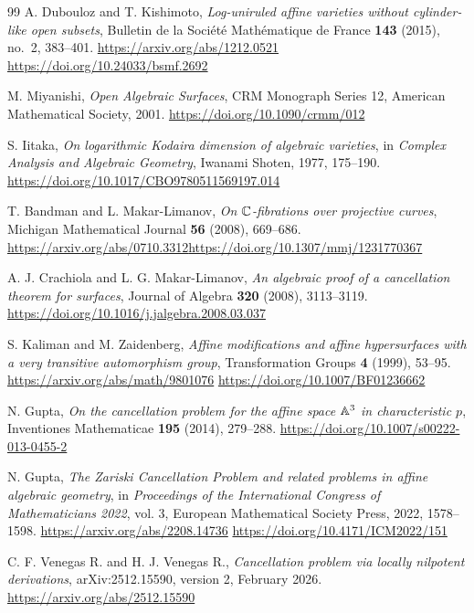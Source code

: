 \begin{thebibliography}{99}
A. Dubouloz and T. Kishimoto,
\emph{Log-uniruled affine varieties without cylinder-like open subsets},
Bulletin de la Soci\'et\'e Math\'ematique de France \textbf{143} (2015), no.~2, 383--401.
\url{https://arxiv.org/abs/1212.0521}\quad
\url{https://doi.org/10.24033/bsmf.2692}

M. Miyanishi,
\emph{Open Algebraic Surfaces},
CRM Monograph Series 12, American Mathematical Society, 2001.
\url{https://doi.org/10.1090/crmm/012}

S. Iitaka,
\emph{On logarithmic Kodaira dimension of algebraic varieties},
in \emph{Complex Analysis and Algebraic Geometry}, Iwanami Shoten, 1977, 175--190.
\url{https://doi.org/10.1017/CBO9780511569197.014}

T. Bandman and L. Makar-Limanov,
\emph{On $\mathbb C$-fibrations over projective curves},
Michigan Mathematical Journal \textbf{56} (2008), 669--686.
\url{https://arxiv.org/abs/0710.3312}\quad\url{https://doi.org/10.1307/mmj/1231770367}

A. J. Crachiola and L. G. Makar-Limanov,
\emph{An algebraic proof of a cancellation theorem for surfaces},
Journal of Algebra \textbf{320} (2008), 3113--3119.
\url{https://doi.org/10.1016/j.jalgebra.2008.03.037}

S. Kaliman and M. Zaidenberg,
\emph{Affine modifications and affine hypersurfaces with a very transitive automorphism group},
Transformation Groups \textbf{4} (1999), 53--95.
\url{https://arxiv.org/abs/math/9801076}\quad
\url{https://doi.org/10.1007/BF01236662}

N. Gupta,
\emph{On the cancellation problem for the affine space $\mathbb A^3$ in characteristic $p$},
Inventiones Mathematicae \textbf{195} (2014), 279--288.
\url{https://doi.org/10.1007/s00222-013-0455-2}

N. Gupta,
\emph{The Zariski Cancellation Problem and related problems in affine algebraic geometry},
in \emph{Proceedings of the International Congress of Mathematicians 2022}, vol. 3,
European Mathematical Society Press, 2022, 1578--1598.
\url{https://arxiv.org/abs/2208.14736}\quad
\url{https://doi.org/10.4171/ICM2022/151}

C. F. Venegas R. and H. J. Venegas R.,
\emph{Cancellation problem via locally nilpotent derivations},
arXiv:2512.15590, version 2, February 2026.
\url{https://arxiv.org/abs/2512.15590}


\end{thebibliography}
